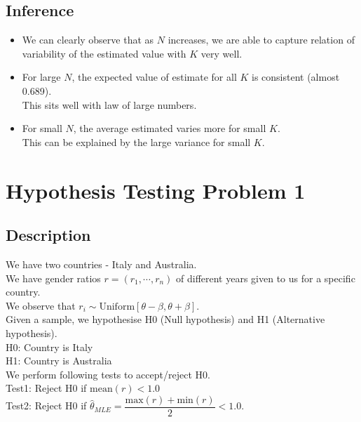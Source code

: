 \documentclass[fleqn, 11pt]{article}
\begin{document}
\subsection{Inference}
\begin{itemize}
    \item We can clearly observe that as $N$ increases, we are able to capture relation of variability of the estimated value with $K$ very well.
    \item For large $N$, the expected value of estimate for all $K$ is consistent (almost 0.689). \\
          This sits well with law of large numbers.
    \item For small $N$, the average estimated varies more for small $K$. \\
          This can be explained by the large variance for small $K$.
\end{itemize}


\newpage
\section{Hypothesis Testing Problem 1}
\setcounter{figure}{0}
\subsection{Description}
We have two countries - Italy and Australia. \\
We have gender ratios $r = (r_1, \cdots ,r_n)$ of different years given to us for a specific country. \\
We observe that $r_i \sim \mathrm{Uniform}[\theta-\beta, \theta+\beta]$. \\
Given a sample, we hypothesise H0 (Null hypothesis) and H1 (Alternative hypothesis). \\
H0: Country is Italy \\
H1: Country is Australia \\
We perform following tests to accept/reject H0. \\
Test1: Reject H0 if $\mathrm{mean}(r) < 1.0$ \\
Test2: Reject H0 if $\hat{\theta}_{MLE} = \dfrac{\mathrm{max}(r) + \mathrm{min}(r)}{2} < 1.0$.
\end{document}
